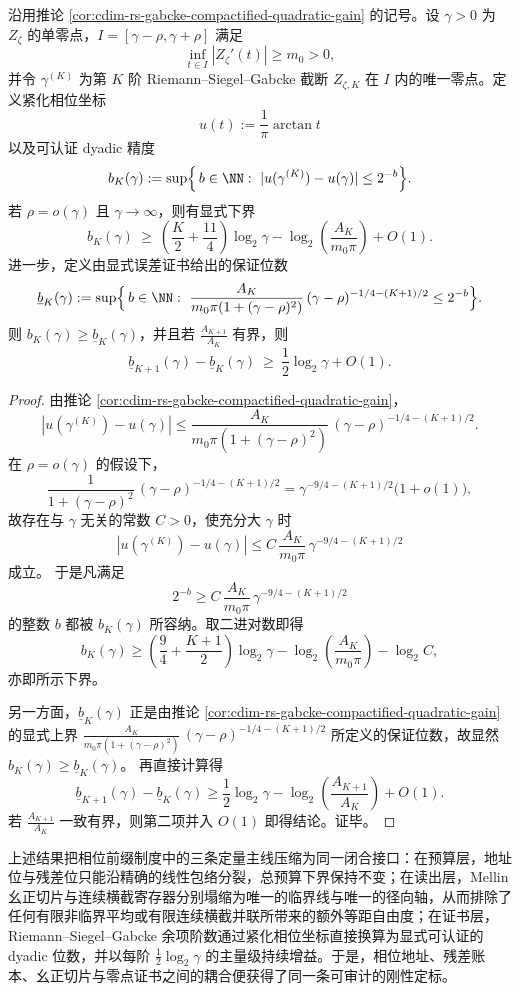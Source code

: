 \begin{theorem}\label{thm:conclusion-gabcke-compactified-dyadic-bit-gain}
沿用推论 \ref{cor:cdim-rs-gabcke-compactified-quadratic-gain} 的记号。设 \(\gamma>0\) 为 \(Z_{\zeta}\) 的单零点，\(I=[\gamma-\rho,\gamma+\rho]\) 满足
\[
\inf_{t\in I}|Z_{\zeta}'(t)|\ge m_0>0,
\]
并令 \(\gamma^{(K)}\) 为第 \(K\) 阶 Riemann--Siegel--Gabcke 截断 \(Z_{\zeta,K}\) 在 \(I\) 内的唯一零点。定义紧化相位坐标
\[
u(t):=\frac{1}{\pi}\arctan t
\]
以及可认证 dyadic 精度
\[
b_K(\gamma):=
\sup\Bigl\{\,b\in\NN:\ |u(\gamma^{(K)})-u(\gamma)|\le 2^{-b}\Bigr\}.
\]
若 \(\rho=o(\gamma)\) 且 \(\gamma\to\infty\)，则有显式下界
\[
\boxed{\;
b_K(\gamma)\ \ge\
\left(\frac{K}{2}+\frac{11}{4}\right)\log_2\gamma
-\log_2\!\left(\frac{A_K}{m_0\pi}\right)
+O(1).\;}
\]
进一步，定义由显式误差证书给出的保证位数
\[
\underline b_K(\gamma):=
\sup\Bigl\{\,b\in\NN:\ \frac{A_K}{m_0\pi(1+(\gamma-\rho)^2)}\,(\gamma-\rho)^{-1/4-(K+1)/2}\le 2^{-b}\Bigr\}.
\]
则 \(b_K(\gamma)\ge \underline b_K(\gamma)\)，并且若 \(\frac{A_{K+1}}{A_K}\) 有界，则
\[
\boxed{\;
\underline b_{K+1}(\gamma)-\underline b_K(\gamma)
\ \ge\
\frac12\log_2\gamma+O(1).\;}
\]
\end{theorem}
\begin{proof}
由推论 \ref{cor:cdim-rs-gabcke-compactified-quadratic-gain}，
\[
|u(\gamma^{(K)})-u(\gamma)|
\le
\frac{A_K}{m_0\pi(1+(\gamma-\rho)^2)}\,(\gamma-\rho)^{-1/4-(K+1)/2}.
\]
在 \(\rho=o(\gamma)\) 的假设下，
\[
\frac{1}{1+(\gamma-\rho)^2}\,(\gamma-\rho)^{-1/4-(K+1)/2}
=
\gamma^{-9/4-(K+1)/2}\bigl(1+o(1)\bigr),
\]
故存在与 \(\gamma\) 无关的常数 \(C>0\)，使充分大 \(\gamma\) 时
\[
|u(\gamma^{(K)})-u(\gamma)|
\le
C\,\frac{A_K}{m_0\pi}\,\gamma^{-9/4-(K+1)/2}
\]
成立。
于是凡满足
\[
2^{-b}\ge C\,\frac{A_K}{m_0\pi}\,\gamma^{-9/4-(K+1)/2}
\]
的整数 \(b\) 都被 \(b_K(\gamma)\) 所容纳。取二进对数即得
\[
b_K(\gamma)\ge
\left(\frac94+\frac{K+1}{2}\right)\log_2\gamma
-\log_2\!\left(\frac{A_K}{m_0\pi}\right)
-\log_2 C,
\]
亦即所示下界。

另一方面，\(\underline b_K(\gamma)\) 正是由推论 \ref{cor:cdim-rs-gabcke-compactified-quadratic-gain} 的显式上界
\(
\frac{A_K}{m_0\pi(1+(\gamma-\rho)^2)}\,(\gamma-\rho)^{-1/4-(K+1)/2}
\)
所定义的保证位数，故显然 \(b_K(\gamma)\ge \underline b_K(\gamma)\)。
再直接计算得
\[
\underline b_{K+1}(\gamma)-\underline b_K(\gamma)
\ge
\frac12\log_2\gamma
-\log_2\!\left(\frac{A_{K+1}}{A_K}\right)
+O(1).
\]
若 \(\frac{A_{K+1}}{A_K}\) 一致有界，则第二项并入 \(O(1)\) 即得结论。证毕。
\end{proof}

上述结果把相位前缀制度中的三条定量主线压缩为同一闭合接口：在预算层，地址位与残差位只能沿精确的线性包络分裂，总预算下界保持不变；在读出层，Mellin 幺正切片与连续横截寄存器分别塌缩为唯一的临界线与唯一的径向轴，从而排除了任何有限非临界平均或有限连续横截并联所带来的额外等距自由度；在证书层，Riemann--Siegel--Gabcke 余项阶数通过紧化相位坐标直接换算为显式可认证的 dyadic 位数，并以每阶 \(\frac12\log_2\gamma\) 的主量级持续增益。于是，相位地址、残差账本、幺正切片与零点证书之间的耦合便获得了同一条可审计的刚性定标。

\endinput
